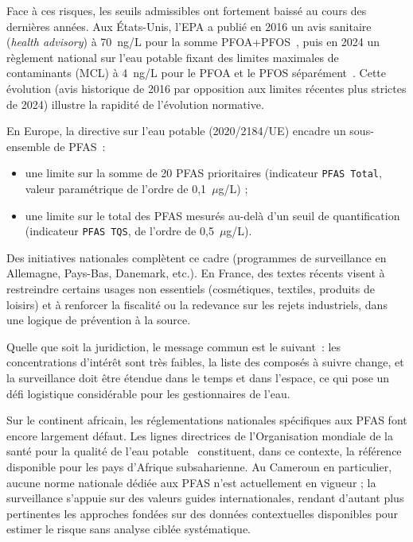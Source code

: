 
Face \`a ces risques, les seuils admissibles ont fortement baiss\'e au cours des derni\`eres ann\'ees.
Aux \'Etats-Unis, l'EPA a publi\'e en 2016 un avis sanitaire (\emph{health advisory}) \`a 70~ng/L pour la somme PFOA+PFOS~\cite{epa2016pfas}, puis en 2024 un r\`eglement national sur l'eau potable fixant des limites maximales de contaminants (MCL) \`a 4~ng/L pour le PFOA et le PFOS s\'epar\'ement~\cite{epa2023npdwr}.
Cette \'evolution (avis historique de 2016 par opposition aux limites r\'ecentes plus strictes de 2024) illustre la rapidit\'e de l'\'evolution normative.

En Europe, la directive sur l'eau potable (2020/2184/UE) encadre un sous-ensemble de PFAS~:
\begin{itemize}
    \item une limite sur la somme de 20 PFAS prioritaires (indicateur \texttt{PFAS Total}, valeur param\'etrique de l'ordre de 0,1~$\mu$g/L) ;
    \item une limite sur le total des PFAS mesur\'es au-del\`a d'un seuil de quantification (indicateur \texttt{PFAS TQS}, de l'ordre de 0,5~$\mu$g/L).
\end{itemize}

Des initiatives nationales compl\`etent ce cadre (programmes de surveillance en Allemagne, Pays-Bas, Danemark, etc.).
En France, des textes r\'ecents visent \`a restreindre certains usages non essentiels (cosm\'etiques, textiles, produits de loisirs) et \`a renforcer la fiscalit\'e ou la redevance sur les rejets industriels, dans une logique de pr\'evention \`a la source.

Quelle que soit la juridiction, le message commun est le suivant~: les concentrations d'int\'er\^et sont tr\`es faibles, la liste des compos\'es \`a suivre change, et la surveillance doit \^etre \'etendue dans le temps et dans l'espace, ce qui pose un d\'efi logistique consid\'erable pour les gestionnaires de l'eau.

Sur le continent africain, les r\'eglementations nationales sp\'ecifiques aux PFAS font encore largement d\'efaut.
Les lignes directrices de l'Organisation mondiale de la sant\'e pour la qualit\'e de l'eau potable~\cite{who2022drinking} constituent, dans ce contexte, la r\'ef\'erence disponible pour les pays d'Afrique subsaharienne.
Au Cameroun en particulier, aucune norme nationale d\'edi\'ee aux PFAS n'est actuellement en vigueur ; la surveillance s'appuie sur des valeurs guides internationales, rendant d'autant plus pertinentes les approches fond\'ees sur des donn\'ees contextuelles disponibles pour estimer le risque sans analyse cibl\'ee syst\'ematique.

